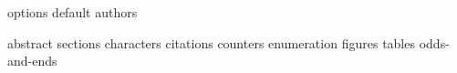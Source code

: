%
%

{options}
{default}
%
%
{authors}

%
%

\title{\fulltitle}

%


%
%

{abstract}
%
%
\keywords{\dockeywords}
{sections}
{characters}
{citations}
{counters}
{enumeration}
{figures}
{tables}
{odds-and-ends}

%
%
\newpage


